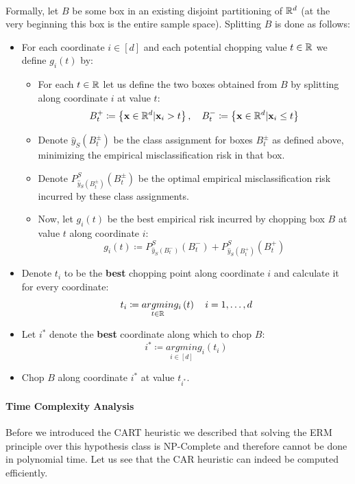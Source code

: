 ~\\Formally, let $B$ be some box in an existing disjoint partitioning of $\mathbb{R}^d$ (at the very beginning this box is the entire sample space). Splitting $B$ is done as follows:
\begin{itemize}
	\item For each coordinate $i\in \left[d\right]$ and each potential chopping value $t\in\mathbb{R}$ we define $g_i\left(t\right)$ by:
	\begin{itemize}
		\item For each $t\in\mathbb{R}$ let us define the two boxes obtained from $B$ by splitting along coordinate $i$ at value $t$: $$ B^+_t\coloneqq \left\{\mathbf{x}\in\mathbb{R}^d|\mathbf{x}_i>t\right\},\quad B^-_t \coloneqq \left\{\mathbf{x}\in\mathbb{R}^d|\mathbf{x}_i\leq t\right\} $$
		\item Denote $\widehat{y}_S\left(B^{\pm}_t\right)$ be  the class assignment for boxes $B^{\pm}_t$ as defined above, minimizing the empirical misclassification risk in that box.
		\item Denote $P^S_{\widehat{y}_S\left(B^{\pm}_t\right)}\left(B^{\pm}_{t}\right)$ be the optimal empirical misclassification risk incurred by these class assignments.
		\item Now, let $g_i\left(t\right)$ be the best empirical risk incurred by chopping box $B$ at value $t$ along coordinate $i$: $$ g_i\left(t\right) \coloneqq  P^S_{\widehat{y}_S\left(B^{-}_t\right)}\left(B^{-}_{t}\right) + P^S_{\widehat{y}_S\left(B^{+}_t\right)}\left(B^{+}_{t}\right) $$ 
	\end{itemize}
	\item Denote $t_i$ to be the \textbf{best} chopping point along coordinate $i$ and calculate it for every coordinate: $$ t_i\coloneqq \underset{t\in\mathbb{R}}{argmin}g_i\left(t\right)\quad i=1,\ldots,d $$
	\item Let $i^{*}$ denote the \textbf{best} coordinate along which to chop $B$: $$ i^{*}\coloneqq \underset{i\in\left[d\right]}{argmin}g_i\left(t_i\right) $$
	\item Chop $B$ along coordinate $i^{*}$  at value $t_{i^{*}}$.
\end{itemize}

\paragraph{Time Complexity Analysis}
Before we introduced the CART heuristic we described that solving the ERM principle over this hypothesis class is NP-Complete and therefore cannot be done in polynomial time. Let us see that the CAR heuristic can indeed be computed efficiently. 

